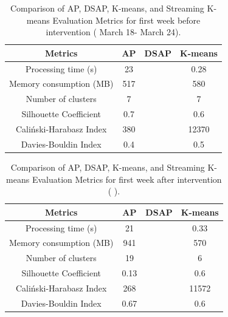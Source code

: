 \documentclass[../UNBThesis2.tex]{subfiles}
\begin{document}





\begin{table}[!h]
    \centering
    \caption{Comparison of AP, DSAP, K-means, and Streaming K-means Evaluation Metrics for first week before intervention ( March 18- March 24).}
    \label{all3}
    \begin{tabular}{|c|c|c|c|}
    \hline
      Metrics & AP & DSAP & K-means  \\
     \hline
      Processing time (s)        &    23     &      & 0.28      \\
     \hline
      Memory consumption (MB)    &     517   &      & 580      \\
     \hline
      Number of clusters         &     7     &      &    7   \\
      \hline
      Silhouette Coefficient     &    0.7    &      &   0.6    \\
    \hline
    Caliński-Harabasz Index      &    380    &      &   12370    \\
    \hline
     Davies-Bouldin Index        &     0.4  &      &  0.5     \\
    \hline
    \end{tabular}
\end{table}







\begin{table}[!h]
    \centering
    \caption{Comparison of AP, DSAP, K-means, and Streaming K-means Evaluation Metrics for first week after intervention ( ).}
    \label{all3}
    \begin{tabular}{|c|c|c|c|}
    \hline
      Metrics & AP & DSAP & K-means  \\
     \hline
      Processing time (s)        &    21     &      &  0.33 \\
     \hline
      Memory consumption (MB)    &     941   &      &  570  \\
     \hline
      Number of clusters         &    19     &      &  6    \\
      \hline
      Silhouette Coefficient     &    0.13    &      &   0.6 \\
    \hline
    Caliński-Harabasz Index      &    268    &      &  11572\\
    \hline
     Davies-Bouldin Index        &     0.67  &      &  0.6  \\
    \hline
    \end{tabular}
\end{table}
\end{document}
